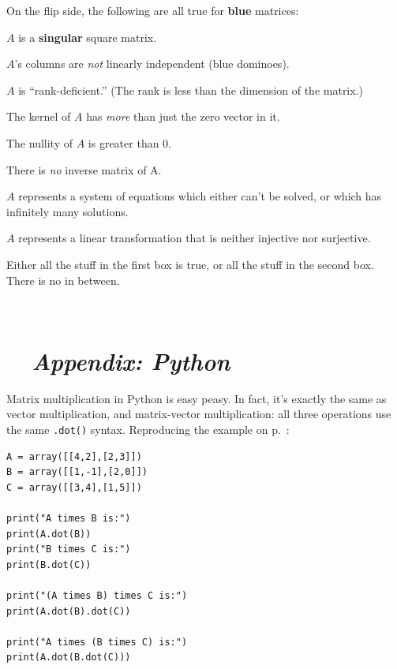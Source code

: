 On the flip side, the following are all true for \textbf{blue} matrices:

\begin{framed}
\begin{compactitem}
\item $A$ is a \textbf{singular} square matrix.
\item $A$'s columns are \textit{not} linearly independent (blue dominoes).
\item $A$ is ``rank-deficient.'' (The rank is less than the dimension of the
matrix.)
\item The kernel of $A$ has \textit{more} than just the zero vector in it.
\item The nullity of $A$ is greater than 0.
\item There is \textit{no} inverse matrix of A.
\item $A$ represents a system of equations which either can't be solved, or
which has infinitely many solutions.
\item $A$ represents a linear transformation that is neither injective nor
surjective.
\end{compactitem}
\end{framed}

Either all the stuff in the first box is true, or all the stuff in the second
box. There is no in between.


\vspace{.1in}
\hrulefill \\

\pagebreak

\section*{\faPython \ \ \textit{Appendix: Python}}


Matrix multiplication in Python is easy peasy. In fact, it's exactly the same
as vector multiplication, and matrix-vector multiplication: all three
operations use the same \texttt{.dot()} syntax. Reproducing the example on
p.~\pageref{associativityExample}:

\begin{Verbatim}[fontsize=\small,samepage=true,frame=single,framesep=3mm]
A = array([[4,2],[2,3]])
B = array([[1,-1],[2,0]])
C = array([[3,4],[1,5]])

print("A times B is:")
print(A.dot(B))
print("B times C is:")
print(B.dot(C))

print("(A times B) times C is:")
print(A.dot(B).dot(C))

print("A times (B times C) is:")
print(A.dot(B.dot(C)))
\end{Verbatim}

